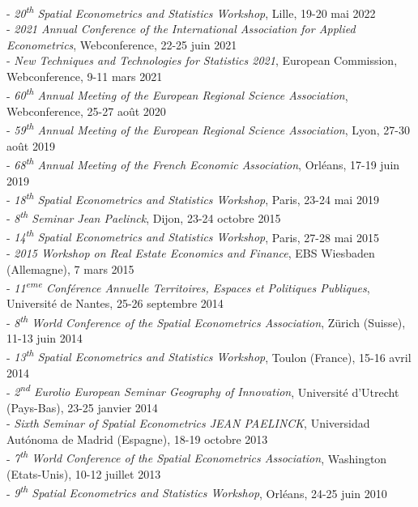 \documentclass[a4paper,12pt]{article}
\begin{document}
\noindent - \textit{20\textsuperscript{th} Spatial Econometrics and Statistics Workshop}, Lille, 19-20 mai 2022\\  
- \textit{2021 Annual Conference of the International Association for Applied Econometrics}, Webconference, 22-25 juin 2021\\
- \textit{New Techniques and Technologies for Statistics 2021}, European Commission, Webconference, 9-11 mars 2021\\
- \textit{60\textsuperscript{th} Annual Meeting of the European Regional Science Association}, Webconference, 25-27 août 2020\\
- \textit{59\textsuperscript{th} Annual Meeting of the European Regional Science Association}, Lyon, 27-30 août 2019\\
- \textit{68\textsuperscript{th} Annual Meeting of the French Economic Association}, Orléans, 17-19 juin 2019\\
- \textit{18\textsuperscript{th} Spatial Econometrics and Statistics Workshop}, Paris, 23-24 mai 2019\\
- \textit{8\textsuperscript{th} Seminar Jean Paelinck}, Dijon, 23-24 octobre 2015\\
- \textit{14\textsuperscript{th} Spatial Econometrics and Statistics Workshop}, Paris, 27-28 mai 2015\\
- \textit{2015 Workshop on Real Estate Economics and Finance}, EBS Wiesbaden (Allemagne), 7 mars 2015\\
- \textit{11\textsuperscript{eme} Conférence Annuelle Territoires, Espaces et Politiques Publiques}, Université de Nantes, 25-26 septembre 2014\\	
- \textit{8\textsuperscript{th} World Conference of the Spatial Econometrics Association}, Zürich (Suisse), 11-13 juin 2014\\
- \textit{13\textsuperscript{th} Spatial Econometrics and Statistics Workshop}, Toulon (France), 15-16 avril 2014\\
- \textit{2\textsuperscript{nd} Eurolio European Seminar Geography of Innovation}, Université d'Utrecht (Pays-Bas), 23-25 janvier 2014\\
- \textit{Sixth Seminar of Spatial Econometrics JEAN PAELINCK}, Universidad Autónoma de Madrid (Espagne), 18-19 octobre 2013\\
- \textit{7\textsuperscript{th} World Conference of the Spatial Econometrics Association}, Washington (Etats-Unis), 10-12 juillet 2013\\
- \textit{9\textsuperscript{th} Spatial Econometrics and Statistics Workshop}, Orléans, 24-25 juin 2010\\
\end{document}
